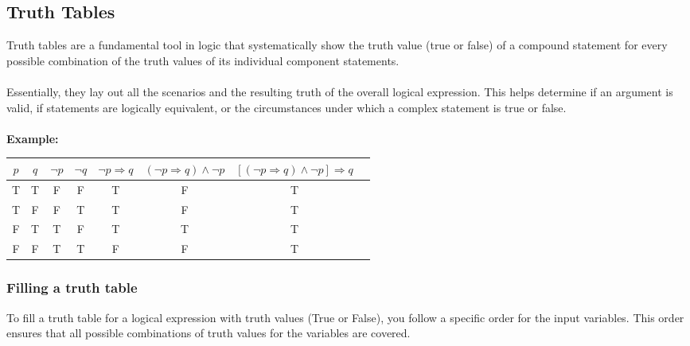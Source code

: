 \subsection{Truth Tables}

Truth tables are a fundamental tool in logic that systematically show the truth value
(true or false) of a compound statement for every possible combination of the truth values of 
its individual component statements.
\\\\
Essentially, they lay out all the scenarios and the resulting truth of the overall logical expression.
This helps determine if an argument is valid, if statements are logically equivalent, or the circumstances
under which a complex statement is true or false.
\\\\
\textbf{Example:}

\begin{center}
	\begin{tabular}{|c|c|c|c|c|c|c|c|}
		\hline
		\(p\) & \(q\) & \(\neg p\) & \(\neg q\) & \(\neg p \Rightarrow q\) & \((\neg p \Rightarrow q) \land \neg p\) & \(\left[(\neg p \Rightarrow q) \land \neg p\right] \Rightarrow q\) \\
		\hline
		T   & T   & F        & F        & T                      & F                                     & T                                                                \\
		T   & F   & F        & T        & T                      & F                                     & T                                                                \\
		F   & T   & T        & F        & T                      & T                                     & T                                                                \\
		F   & F   & T        & T        & F                      & F                                     & T                                                                \\
		\hline
	\end{tabular}
\end{center}

\subsubsection{Filling a truth table}
To fill a truth table for a logical expression with truth values (True or False), you follow a specific order for the input variables. This order ensures that all possible combinations of truth values for the variables are covered.

